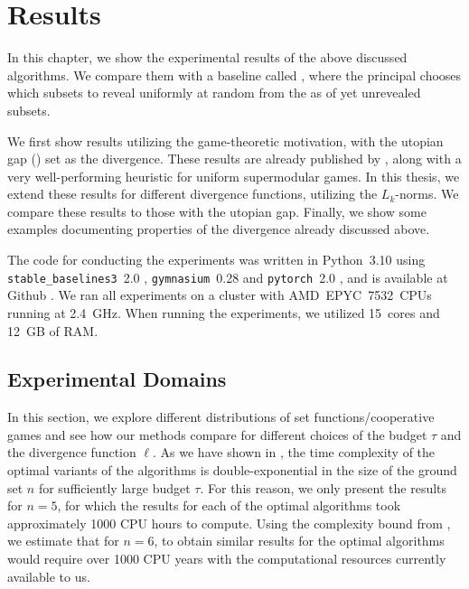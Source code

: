 \chapter{Results}
\label{chap:results}

In this chapter, we show the experimental results of the above discussed algorithms.
We compare them with a baseline called \algRand{}, where the principal chooses which subsets to reveal uniformly at random from the as of yet unrevealed subsets.

We first show results utilizing the game-theoretic motivation, with the utopian gap () set as the divergence.
These results are already published by \cite{uradnik2024reducing}, along with a very well-performing heuristic for uniform supermodular games.
In this thesis, we extend these results for different divergence functions, utilizing the $ L_k $-norms.
We compare these results to those with the utopian gap.
Finally, we show some examples documenting properties of the divergence already discussed above.

The code for conducting the experiments was written in Python~3.10 using \texttt{stable\_baselines3}~2.0 \citep{stable-baselines3}, \texttt{gymnasium}~0.28 \citep{towers_gymnasium_2023} and \texttt{pytorch}~2.0 \citep{Ansel_PyTorch_2_Faster_2024}, and is available at Github \citep{gitrepo}.
We ran all experiments on a cluster with AMD~EPYC~7532~CPUs running at 2.4~GHz.
When running the experiments, we utilized 15~cores and 12~GB of RAM.

\section{Experimental Domains}

In this section, we explore different distributions of set functions/cooperative games and see how our methods compare for different choices of the budget $ \tau $ and the divergence function $ \ell $.
As we have shown in , the time complexity of the optimal variants of the algorithms is double-exponential in the size of the ground set $ n $ for sufficiently large budget $ \tau $.
For this reason, we only present the results for $ n=5 $, for which the results for each of the optimal algorithms took approximately 1000 CPU hours to compute.
Using the complexity bound from , we estimate that for $ n=6 $, to obtain similar results for the optimal algorithms  would require over 1000 CPU years with the computational resources currently available to us.

